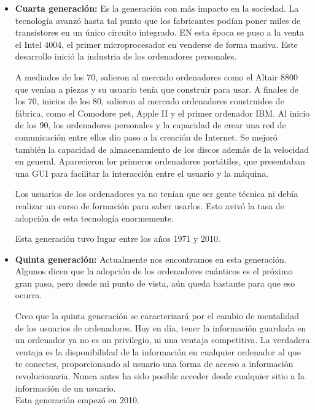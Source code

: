 \documentclass[titlepage, 12pt, a4paper]{article}
\begin{document}
\begin{itemize}
	\item{\textbf{Cuarta generación: }}Es la generación con más impacto en la sociedad. La tecnología avanzó hasta tal punto que los fabricantes podían poner miles de transistores en un único circuito integrado. EN esta época se puso a la venta el Intel 4004, el primer microprocesador en venderse de forma masiva. Este desarrollo inició la industria de los ordenadores personales.\par A mediados de los 70, salieron al mercado ordenadores como el Altair 8800 que venían a piezas y su usuario tenía que construir para usar. A finales de los 70, inicios de los 80, salieron al mercado ordenadores construidos de fábrica, como el Comodore pet, Apple II y el primer ordenador IBM. Al inicio de los 90, los ordenadores personales y la capacidad de crear una red de comunicación entre ellos dio paso a la creación de Internet. Se mejoró también la capacidad de almacenamiento de los discos además de la velocidad en general. Aparecieron lor primeros ordenadores portátiles, que presentaban una \Gls{GUI} para facilitar la interacción entre el usuario y la máquina.\par Los usuarios de los ordenadores ya no tenían que ser gente técnica ni debía realizar un curso de formación para saber usarlos. Esto avivó la tasa de adopción de esta tecnología enormemente.\par Esta generación tuvo lugar entre los años 1971 y 2010.
	\item{\textbf{Quinta generación: }}Actualmente nos encontramos en esta generación. Algunos dicen que la adopción de los ordenadores cuánticos es el próximo gran paso, pero desde mi punto de vista, aún queda bastante para que eso ocurra.\par Creo que la quinta generación se caracterizará por el cambio de mentalidad de los usuarios de ordenadores. Hoy en día, tener la información guardada en un ordenador ya no es un privilegio, ni una ventaja competitiva. La verdadera ventaja es la disponibilidad de la información en cualquier ordenador al que te conectes, proporcionando al usuario una forma de acceso a información revolucionaria. Nunca antes ha sido posible acceder desde cualquier sitio a la información de un usuario.\\Esta generación empezó en 2010.
\end{itemize}
\end{document}
